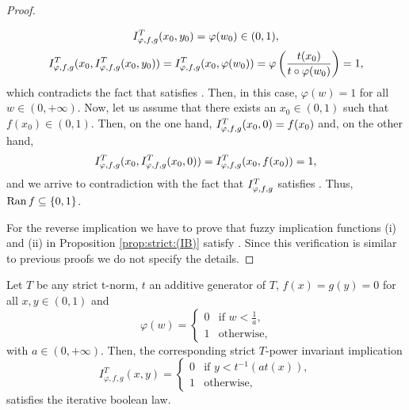 \begin{proof}
\begin{enumerate}
		$$ I^T_{\varphi,f,g}(x_0,y_0) = \varphi(w_0) \in (0,1),$$
		$$I^T_{\varphi,f,g}(x_0,I^T_{\varphi,f,g}(x_0,y_0))=I^T_{\varphi,f,g}(x_0,\varphi(w_0))=\varphi \left(\frac{t(x_0)}{t \circ \varphi (w_0)}\right) = 1,$$
		which contradicts the fact that \IT satisfies \IB. Then, in this case, $\varphi(w)=1$ for all $w \in (0,+\infty)$. Now, let us assume that there exists an $x_0 \in (0,1)$ such that $f(x_0) \in (0,1)$. Then, on the one hand, $I^T_{\varphi,f,g}(x_0,0)=f(x_0)$ and, on the other hand,
		$$I^T_{\varphi,f,g}(x_0,I^T_{\varphi,f,g}(x_0,0))=I^T_{\varphi,f,g}(x_0,f(x_0))=1,$$
		and we arrive to contradiction with the fact that $I^T_{\varphi,f,g}$ satisfies \IB. Thus, $\operatorname{Ran} f \subseteq \{0,1\}$.
	\end{enumerate}
	For the reverse implication we have to prove that fuzzy implication functions (i) and (ii) in Proposition \ref{prop:strict:(IB)} satisfy \IB.	Since this verification is similar to previous proofs we do not specify the details.
\end{proof}
\begin{example}\label{example:strict:(IB)} Let $T$ be any strict t-norm, $t$ an additive generator of $T$, $f(x)=g(y)=0$ for all $x,y\in(0,1)$ and
	$$\varphi(w)= \left\{ \begin{array}{ll}
		0 &   \text{if }   w < \frac{1}{a}, \\
		1 &  \text{otherwise}, 	\end{array}
	\right.
	$$	
	with $a \in (0,+\infty)$. Then, the corresponding strict $T$-power invariant implication
	\begin{equation*}
		I^T_{\varphi,f,g}(x,y) =\left\{ \begin{array}{ll}
			0 & \text{if }  y<t^{-1}(at(x)),\\
			1 &  \text{otherwise},
		\end{array}
		\right.
	\end{equation*}
	satisfies the iterative boolean law.
\end{example}

